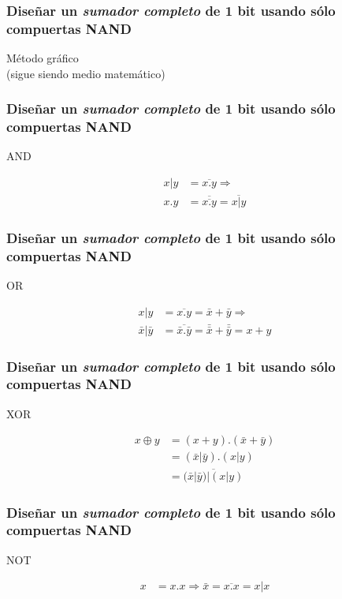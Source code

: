 \documentclass[mathserif,hyperref]{beamer}
\begin{document}
\begin{frame}
\frametitle{\small Diseñar un \textit{sumador completo} de 1 bit usando sólo
compuertas NAND}
\begin{center}
  Método gráfico
  \\ {\tiny (sigue siendo medio matemático)}
\end{center}
\end{frame}


\begin{frame}
\frametitle{\small Diseñar un \textit{sumador completo} de 1 bit usando sólo
compuertas NAND}
\begin{center}AND\end{center}
\begin{align*}
  x | y &= \overline{x . y} \Rightarrow \\
  x . y &= 
  \overline{\overline{x . y}} = 
  \overline{x | y}
\end{align*}
\end{frame}


\begin{frame}
\frametitle{\small Diseñar un \textit{sumador completo} de 1 bit usando sólo
compuertas NAND}
\begin{center}OR\end{center}
\begin{align*}
  x | y &= \overline{x . y} = \bar{x} + \bar{y} \Rightarrow \\
  \bar{x} | \bar{y} &=
  \overline{\bar{x} . \bar{y}} =
  \bar{\bar{x}} + \bar{\bar{y}} =
  x + y
\end{align*}
\end{frame}


\begin{frame}
\frametitle{\small Diseñar un \textit{sumador completo} de 1 bit usando sólo
compuertas NAND}
\begin{center}XOR\end{center}
\begin{align*}
  x \oplus y &= (x + y) . (\bar{x} + \bar{y}) \\
   &= (\bar{x} | \bar{y}) . (x | y) \\
   &= \overline{(\bar{x} | \bar{y}) | (x | y)}
\end{align*}
\end{frame}


\begin{frame}
\frametitle{\small Diseñar un \textit{sumador completo} de 1 bit usando sólo
compuertas NAND}
\begin{center}NOT\end{center}
\begin{align*}
  x &= x . x \Rightarrow 
  \bar{x} = \overline{x . x}
   = x | x
\end{align*}
\end{frame}
\end{document}
